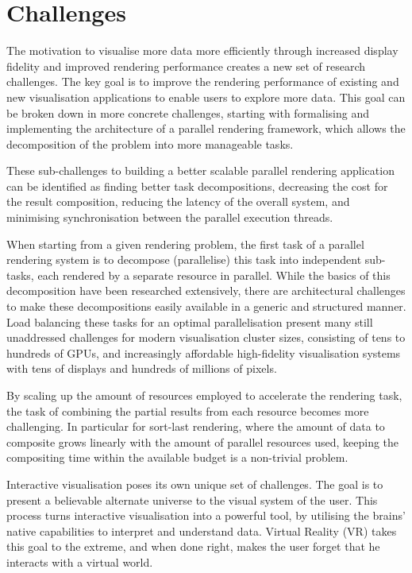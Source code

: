 \section{Challenges}

The motivation to visualise more data more efficiently through increased
display fidelity and improved rendering performance creates a new set of
research challenges. The key goal is to improve the rendering performance of
existing and new visualisation applications to enable users to explore more
data. This goal can be broken down in more concrete challenges, starting with
formalising and implementing the architecture of a parallel rendering
framework, which allows the decomposition of the problem into more manageable tasks.

These sub-challenges to building a better scalable parallel rendering application
can be identified as finding better task decompositions, decreasing the cost
for the result composition, reducing the latency of the overall system, and
minimising synchronisation between the parallel execution threads.

When starting from a given rendering problem, the first task of a parallel
rendering system is to decompose (parallelise) this task into independent
sub-tasks, each rendered by a separate resource in parallel. While the basics
of this decomposition have been researched extensively, there are architectural
challenges to make these decompositions easily available in a generic and
structured manner. Load balancing these tasks for an optimal
parallelisation present many still unaddressed challenges for modern
visualisation cluster sizes, consisting of tens to hundreds of GPUs, and increasingly
affordable high-fidelity visualisation systems with tens of displays and
hundreds of millions of pixels.

By scaling up the amount of resources employed to accelerate the
rendering task, the task of combining the partial results from each resource
becomes more challenging. In particular for sort-last rendering, where the
amount of data to composite grows linearly with the amount of parallel resources
used, keeping the compositing time within the available budget is a non-trivial
problem.

Interactive visualisation poses its own unique set of challenges. The goal is to
present a believable alternate universe to the visual system of the user. This
process turns interactive visualisation into a powerful tool, by utilising
the brains' native capabilities to interpret and understand data. Virtual
Reality (VR) takes this goal to the extreme, and when done right, makes the user
forget that he interacts with a virtual world.

